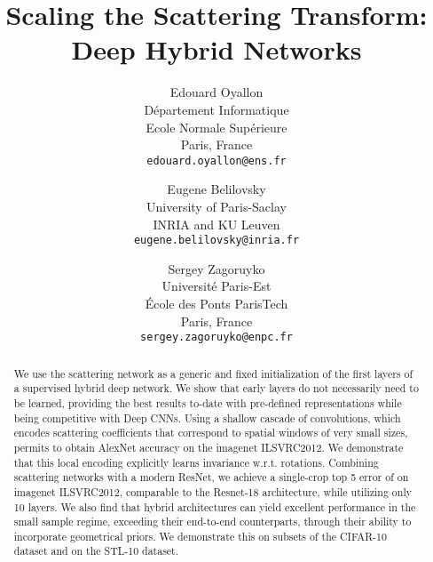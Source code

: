 \documentclass[10pt,twocolumn,letterpaper]{article}
\begin{document}
\title{Scaling the Scattering Transform: Deep Hybrid Networks}

\author{Edouard Oyallon\\
D\'epartement Informatique\\
Ecole Normale Sup\'erieure\\
Paris, France\\
{\tt\small edouard.oyallon@ens.fr}
\and
Eugene Belilovsky\\
University of Paris-Saclay\\ INRIA
and KU Leuven\\
{\tt\small eugene.belilovsky@inria.fr}
\and
Sergey Zagoruyko\\
 Universit\'e Paris-Est\\
  \'Ecole des Ponts ParisTech\\
 Paris, France\\
{\tt\small sergey.zagoruyko@enpc.fr}
}

\maketitle




\begin{abstract}






We use the scattering network as a generic and fixed initialization of the first layers of a supervised hybrid deep network. We show that early layers do not necessarily need to be learned, providing the best results to-date with pre-defined representations while being competitive with Deep CNNs. Using a shallow cascade of  convolutions, which encodes scattering coefficients that correspond to spatial windows of very small sizes, permits to obtain AlexNet accuracy on the imagenet ILSVRC2012. We demonstrate that this local encoding explicitly learns invariance w.r.t. rotations. Combining scattering networks with a modern ResNet, we achieve a single-crop top 5 error of  on imagenet ILSVRC2012, comparable to the Resnet-18 architecture, while utilizing only 10 layers. We also find that hybrid architectures can yield excellent performance in the small sample regime, exceeding their end-to-end counterparts, through their ability to incorporate geometrical priors. We demonstrate this on subsets of the CIFAR-10 dataset and on the STL-10 dataset. 

\end{abstract}
\end{document}
